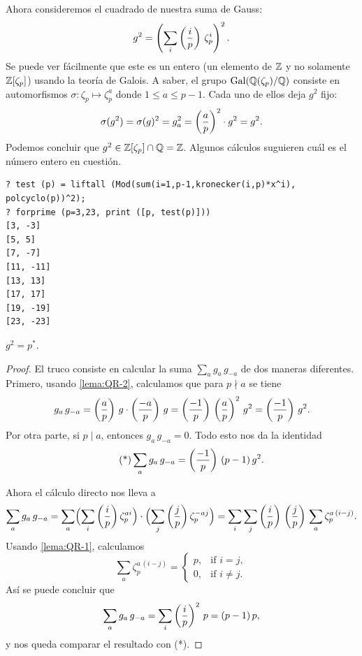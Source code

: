 Ahora consideremos el cuadrado de nuestra suma de Gauss:
$$g^2 = \left(\sum_i \left(\frac{i}{p}\right) \, \zeta_p^i\right)^2.$$
Se puede ver fácilmente que este es un entero (un elemento de $\mathbb{Z}$ y no
solamente $\mathbb{Z} [\zeta_p]$) usando la teoría de Galois. A saber, el grupo
$\operatorname{Gal} (\mathbb{Q} (\zeta_p)/\mathbb{Q})$ consiste en automorfismos
$\sigma\colon \zeta_p \mapsto \zeta_p^a$ donde $1 \le a \le p-1$.
Cada uno de ellos deja $g^2$ fijo:
$$\sigma (g^2) = \sigma (g)^2 = g_a^2 = \left(\frac{a}{p}\right)^2\cdot g^2 = g^2.$$
Podemos concluir que $g^2 \in \mathbb{Z} [\zeta_p] \cap \mathbb{Q} = \mathbb{Z}$.
Algunos cálculos suguieren cuál es el número entero en cuestión.

\begin{shaded}
\begin{verbatim}
? test (p) = liftall (Mod(sum(i=1,p-1,kronecker(i,p)*x^i), polcyclo(p))^2);
? forprime (p=3,23, print ([p, test(p)]))
[3, -3]
[5, 5]
[7, -7]
[11, -11]
[13, 13]
[17, 17]
[19, -19]
[23, -23]
\end{verbatim}
\end{shaded}

\begin{lema}
  \label{lema:QR-3}
  $g^2 = p^*$.

  \begin{proof}
    El truco consiste en calcular la suma $\sum_a g_a\,g_{-a}$ de dos maneras
    diferentes. Primero, usando \ref{lema:QR-2}, calculamos que para $p \nmid a$
    se tiene
    \[ g_a\,g_{-a} =
       \left(\frac{a}{p}\right)\,g\cdot \left(\frac{-a}{p}\right)\,g =
       \left(\frac{-1}{p}\right)\,\left(\frac{a}{p}\right)^2\,g^2 =
       \left(\frac{-1}{p}\right)\,g^2. \]
    Por otra parte, si $p \mid a$, entonces $g_a\,g_{-a} = 0$.
    Todo esto nos da la identidad
    \[ \tag{*} \sum_a g_a\,g_{-a} = \left(\frac{-1}{p}\right)\,(p-1)\,g^2. \]

    Ahora el cálculo directo nos lleva a
    \[ \sum_a g_a \, g_{-a} =
       \sum_a \Bigl(\sum_i \left(\frac{i}{p}\right) \zeta_p^{ai}\Bigr)\cdot\Bigl(\sum_j \left(\frac{j}{p}\right) \zeta_p^{-aj}\Bigr) =
       \sum_i \sum_j \left(\frac{i}{p}\right)\,\left(\frac{j}{p}\right)\,\sum_a \zeta_p^{a\,(i-j)}. \]
    Usando \ref{lema:QR-1}, calculamos
    \[ \sum_a \zeta_p^{a\,(i-j)} = \begin{cases}
      p, & \text{if } i = j,\\
      0, & \text{if } i \ne j.
    \end{cases} \]
    Así se puede concluir que
    $$\sum_a g_a \, g_{-a} = \sum_i \left(\frac{i}{p}\right)^2\,p = (p-1)\,p,$$
    y nos queda comparar el resultado con (*).
  \end{proof}
\end{lema}

